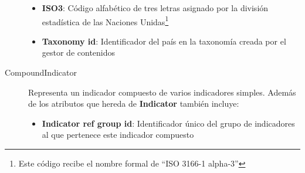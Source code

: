 \begin{description}
\begin{itemize}
		\item \textbf{ISO3}:  Código alfabético de tres letras asignado por la división estadística de las Naciones Unidas\footnote{Este código recibe el nombre formal de ``ISO 3166-1 alpha-3''}
		\item \textbf{Taxonomy id}:  Identificador del país en la taxonomía creada por el gestor de contenidos
	\end{itemize}
	\item[CompoundIndicator]  Representa un indicador compuesto de varios indicadores simples.  Además de los atributos que hereda de \textbf{Indicator} también incluye:
		\begin{itemize}
			\item \textbf{Indicator ref group id}:  Identificador único del grupo de indicadores al que pertenece este indicador compuesto
		\end{itemize}
\end{description}

